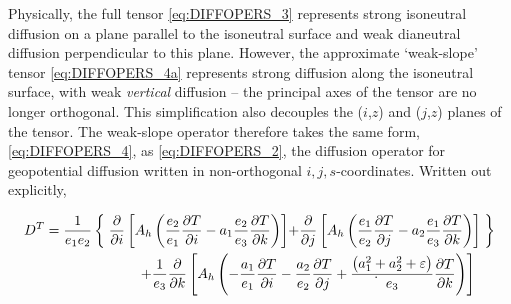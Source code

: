 \documentclass[../main/NEMO_manual]{subfiles}
\begin{document}
Physically, the full tensor \autoref{eq:DIFFOPERS_3} represents strong isoneutral diffusion on a plane parallel to
the isoneutral surface and weak dianeutral diffusion perpendicular to this plane.
However,
the approximate `weak-slope' tensor \autoref{eq:DIFFOPERS_4a} represents strong diffusion along the isoneutral surface,
with weak \emph{vertical} diffusion -- the principal axes of the tensor are no longer orthogonal.
This simplification also decouples the ($i$,$z$) and ($j$,$z$) planes of the tensor.
The weak-slope operator therefore takes the same form, \autoref{eq:DIFFOPERS_4}, as \autoref{eq:DIFFOPERS_2},
the diffusion operator for geopotential diffusion written in non-orthogonal $i,j,s$-coordinates.
Written out explicitly,

\begin{multline}
  \label{eq:DIFFOPERS_ldfiso}
  D^T=\frac{1}{e_1 e_2 }\left\{
    {\;\frac{\partial }{\partial i}\left[ {A_h \left( {\frac{e_2}{e_1}\frac{\partial T}{\partial i}-a_1 \frac{e_2}{e_3}\frac{\partial T}{\partial k}} \right)} \right]}
    {+\frac{\partial}{\partial j}\left[ {A_h \left( {\frac{e_1}{e_2}\frac{\partial T}{\partial j}-a_2 \frac{e_1}{e_3}\frac{\partial T}{\partial k}} \right)} \right]\;} \right\} \\
  \shoveright{+\frac{1}{e_3 }\frac{\partial }{\partial k}\left[ {A_h \left( {-\frac{a_1 }{e_1 }\frac{\partial T}{\partial i}-\frac{a_2 }{e_2 }\frac{\partial T}{\partial j}+\frac{\left( {a_1 ^2+a_2 ^2+\varepsilon} \right)}{e_3 }\frac{\partial T}{\partial k}} \right)} \right]}. \\
\end{multline}
\end{document}
